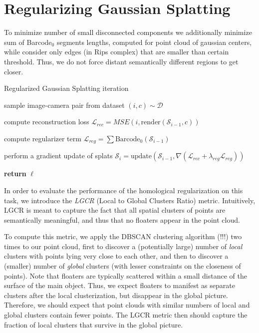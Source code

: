 \section{Regularizing Gaussian Splatting}
To minimize number of small disconnected components we additionally minimize sum of Barcode${}_0$ segments lengths, computed for point cloud of gaussian centers, while consider only edges (in Rips complex) that are smaller than certain threshold. Thus, we do not force distant semantically different regions to get closer.
\begin{algorithm}[h!]
\caption{Regularized Gaussian Splatting iteration \label{algo:reg}}
\SetAlgoLined
{}
sample image-camera pair from dataset $(i, c) \sim \mathcal{D}$

compute reconstruction loss $\mathcal{L}_{rec} = MSE(i, \text{render}({\mathcal{S}}_{i-1}, c))$

compute regularizer term $\mathcal{L}_{reg} = \sum \text{Barcode}_0 ({\mathcal{S}}_{i-1})$

perform a gradient update of splats ${\mathcal{S}}_{i} = \text{update} ({\mathcal{S}}_{i - 1}, \nabla (\mathcal{L}_{rec} + \lambda_{reg}\mathcal{L}_{reg}))$

\textbf{return} $\ell$
\end{algorithm}
In order to evaluate the performance of the homological regularization on this task, we introduce the \emph{LGCR} (Local to Global Clusters Ratio) metric. Intuitively, LGCR is meant to capture the fact that all spatial clusters of points are semantically meaningful, and thus that no floaters appear in the point cloud. 

To compute this metric, we apply the DBSCAN clustering algorithm (!!!) two times to our point cloud, first to discover a (potentially large) number of \emph{local} clusters with points lying very close to each other, and then to discover a (smaller) number of \emph{global} clusters (with lesser constraints on the closeness of points). 
Note that floaters are typically scattered within a small distance of the surface of the main object. Thus, we expect floaters to manifest as separate clusters after the local clusterization, but disappear in the global picture. Therefore, we should expect that point clouds with similar numbers of local and global clusters contain fewer points. The LGCR metric then should capture the fraction of local clusters that survive in the global picture. 

